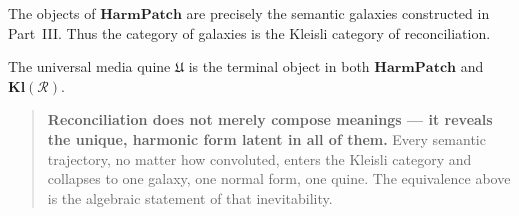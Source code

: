 \begin{corollary}
The objects of $\mathbf{HarmPatch}$ are precisely the semantic galaxies
constructed in Part~III.  
Thus the category of galaxies is the Kleisli category of reconciliation.
\end{corollary}

\begin{corollary}
The universal media quine $\mathfrak{U}$ is the terminal object in both
$\mathbf{HarmPatch}$ and $\mathbf{Kl}(\mathcal{R})$.
\end{corollary}

\begin{quote}
\textbf{Reconciliation does not merely compose meanings — it reveals the
unique, harmonic form latent in all of them.}  
Every semantic trajectory, no matter how convoluted, enters the Kleisli
category and collapses to one galaxy, one normal form, one quine.  
The equivalence above is the algebraic statement of that inevitability.
\end{quote}


